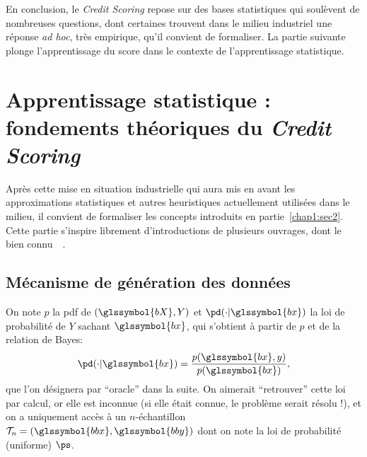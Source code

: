 \medskip

En conclusion, le \textit{Credit Scoring} repose sur des bases statistiques qui soulèvent de nombreuses questions, dont certaines trouvent dans le milieu industriel une réponse \textit{ad hoc}, très empirique, qu'il convient de formaliser. La partie suivante plonge l'apprentissage du \gls{score} dans le contexte de l'apprentissage statistique.

\section{Apprentissage statistique : fondements théoriques du \textit{Credit Scoring}} \label{chap1:sec3}

Après cette mise en situation industrielle qui aura mis en avant les approximations statistiques et autres heuristiques actuellement utilisées dans le milieu, il convient de formaliser les concepts introduits en partie~\ref{chap1:sec2}. Cette partie s'inspire librement d'introductions de plusieurs ouvrages, dont le bien connu~~\cite{friedman2001elements}.

\subsection{Mécanisme de génération des données}

On note $p$ la \gls{pdf} de $(\glssymbol{bX},Y)$ et $\pd(\cdot | \glssymbol{bx})$ la loi de probabilité de $Y$ sachant $\glssymbol{bx}$, qui s'obtient à partir de $p$ et de la relation de Bayes: $$\pd(\cdot | \glssymbol{bx}) = \frac{p(\glssymbol{bx},y)}{p(\glssymbol{bx})},$$ que l'on désignera par ``oracle'' dans la suite. On aimerait ``retrouver'' cette loi par calcul, or elle est inconnue (si elle était connue, le problème serait résolu !), et on a uniquement accès à un $n$-échantillon $\mathcal{T}_n = (\glssymbol{bbx},\glssymbol{bby})$ dont on note la loi de probabilité (uniforme) $\ps$.

